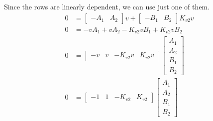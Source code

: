 Since the rows are linearly dependent, we can use just one of them.
\begin{align*}
  0 &=
    \begin{bmatrix}
      -A_1 & A_2
    \end{bmatrix} v +
    \begin{bmatrix}
      -B_1 & B_2
    \end{bmatrix} K_{v2} v \\
  0 &= -v A_1 + v A_2 - K_{v2} v B_1 + K_{v2} v B_2 \\
  0 &=
    \begin{bmatrix}
      -v & v & -K_{v2} v & K_{v2} v
    \end{bmatrix}
    \begin{bmatrix}
      A_1 \\
      A_2 \\
      B_1 \\
      B_2
    \end{bmatrix} \\
  0 &=
    \begin{bmatrix}
      -1 & 1 & -K_{v2} & K_{v2}
    \end{bmatrix}
    \begin{bmatrix}
      A_1 \\
      A_2 \\
      B_1 \\
      B_2
    \end{bmatrix}
\end{align*}


